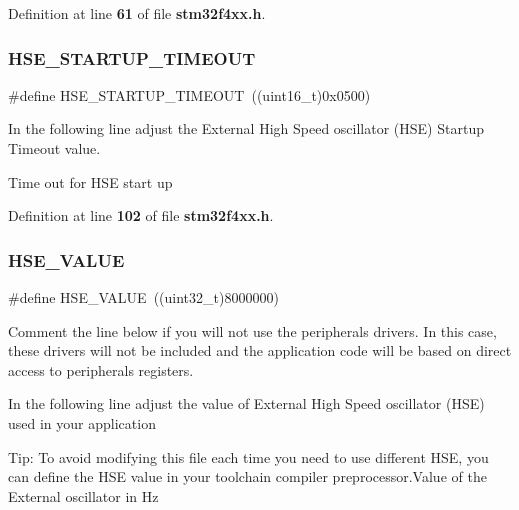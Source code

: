 Definition at line \textbf{ 61} of file \textbf{ stm32f4xx.\+h}.

\mbox{\label{group__Library__configuration__section_ga68ecbc9b0a1a40a1ec9d18d5e9747c4f}} 
\subsubsection{H\+S\+E\+\_\+\+S\+T\+A\+R\+T\+U\+P\+\_\+\+T\+I\+M\+E\+O\+UT}
{\footnotesize\ttfamily \#define H\+S\+E\+\_\+\+S\+T\+A\+R\+T\+U\+P\+\_\+\+T\+I\+M\+E\+O\+UT~((uint16\+\_\+t)0x0500)}



In the following line adjust the External High Speed oscillator (H\+SE) Startup Timeout value. 

Time out for H\+SE start up 

Definition at line \textbf{ 102} of file \textbf{ stm32f4xx.\+h}.

\mbox{\label{group__Library__configuration__section_gaeafcff4f57440c60e64812dddd13e7cb}} 
\subsubsection{H\+S\+E\+\_\+\+V\+A\+L\+UE}
{\footnotesize\ttfamily \#define H\+S\+E\+\_\+\+V\+A\+L\+UE~((uint32\+\_\+t)8000000)}



Comment the line below if you will not use the peripherals drivers. In this case, these drivers will not be included and the application code will be based on direct access to peripherals registers. 

In the following line adjust the value of External High Speed oscillator (H\+SE) used in your application

Tip\+: To avoid modifying this file each time you need to use different H\+SE, you can define the H\+SE value in your toolchain compiler preprocessor.\+Value of the External oscillator in Hz 

